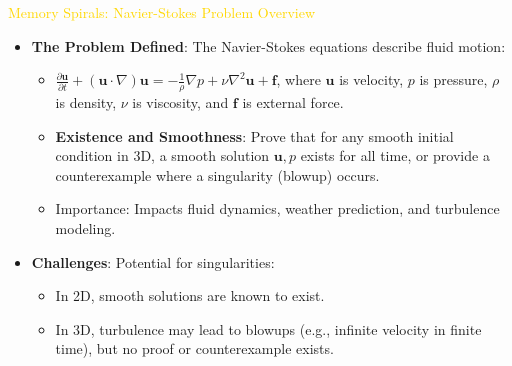 \textcolor{gold}{ Memory Spirals: Navier-Stokes Problem Overview } \\
\begin{itemize}
    \item \texttt{} \textbf{The Problem Defined}: The Navier-Stokes equations describe fluid motion:
    \begin{itemize}
        \item \(\frac{\partial \mathbf{u}}{\partial t} + (\mathbf{u} \cdot \nabla) \mathbf{u} = -\frac{1}{\rho} \nabla p + \nu \nabla^2 \mathbf{u} + \mathbf{f}\), where \(\mathbf{u}\) is velocity, \(p\) is pressure, \(\rho\) is density, \(\nu\) is viscosity, and \(\mathbf{f}\) is external force.
        \item \textbf{Existence and Smoothness}: Prove that for any smooth initial condition in 3D, a smooth solution \(\mathbf{u}, p\) exists for all time, or provide a counterexample where a singularity (blowup) occurs.
        \item Importance: Impacts fluid dynamics, weather prediction, and turbulence modeling.
    \end{itemize}
    \item \texttt{} \textbf{Challenges}: Potential for singularities:
    \begin{itemize}
        \item In 2D, smooth solutions are known to exist.
        \item In 3D, turbulence may lead to blowups (e.g., infinite velocity in finite time), but no proof or counterexample exists.
    \end{itemize}
\end{itemize}

